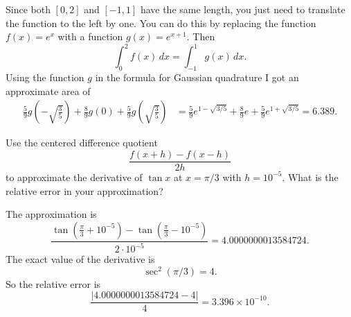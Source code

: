 \documentclass[11pt]{exam}
\newcommand{\ds}{\displaystyle}
\begin{document}
\begin{questions}
\begin{solution}
Since both $[0,2]$ and $[-1,1]$ have the same length, you just need to translate the function to the left by one.  You can do this by replacing the function $f(x) = e^x$ with a function $g(x) = e^{x+1}$.  Then 
$$\int_0^2 f(x) \, dx = \int_{-1}^1 g(x) \, dx.$$
Using the function $g$ in the formula for Gaussian quadrature I got an approximate area of 
\begin{align*}
\tfrac{5}{9}g\left(-\sqrt{\tfrac{3}{5}}\right) + \tfrac{8}{9} g(0) + \tfrac{5}{9} g\left(\sqrt{\tfrac{3}{5}}\right) &= \tfrac{5}{9}e^{1 - \sqrt{3/5}}+\tfrac{8}{9} e + \tfrac{5}{9} e^{1+\sqrt{3/5}} = 6.389.
\end{align*}

\end{solution}
\vfill



\question Use the centered difference quotient 
$$\dfrac{f(x+h) - f(x-h)}{2h}$$
to approximate the derivative of $\tan x$ at $x = \pi/3$ with $h = 10^{-5}$.  What is the relative error in your approximation?  
\begin{solution}
The approximation is 
$$\frac{\tan(\tfrac{\pi}{3} + 10^{-5}) - \tan(\tfrac{\pi}{3} - 10^{-5})}{2 \cdot 10^{-5}} = 4.0000000013584724.$$
The exact value of the derivative is
$$\sec^2(\pi/3) = 4.$$
So the relative error is 
$$\frac{|4.0000000013584724 - 4|}{4} = 3.396 \times 10^{-10}.$$
\end{solution}
\vfill




\end{questions}
\end{document}
